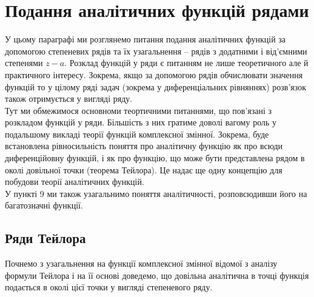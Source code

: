 
% 

% 

\setcounter{section}{4}
\section{Подання аналітичних функцій рядами}

У цьому параграфі ми розглянемо питання подання аналітичних функцій за допомогою степеневих рядів та їх узагальнення -- рядів з додатними і від'ємними степенями $z - a$. Розклад функцій у ряди є питанням не лише теоретичного але й практичного інтересу. Зокрема, якщо за допомогою рядів обчислювати значення функцій то у цілому ряді задач (зокрема у диференціальних рівняннях) розв'язок також отримується у вигляді ряду. \\

Тут ми обмежимося основноми теортичними питаннями, що пов'язані з розкладом функцій у ряди. Більшість з них гратиме доволі вагому роль у подальшому викладі теорії функцій комплексної змінної. Зокрема, буде встановлена рівносильність поняття про аналітичну функцію як про всюди диференційовну функцій, і як про функцію, що може бути представлена рядом в околі довільної точки (теорема Тейлора). Це надає ще одну концепцію для побудови теорії аналітичних функцій. \\

У пункті 9 ми також узагальнимо поняття аналітичності, розповсюдивши його на багатозначні функції.

\subsection{Ряди Тейлора}

Почнемо з узагальнення на функції комплексної змінної відомої з аналізу формули Тейлора і на її основі доведемо, що довільна аналітична в точці функція подається в околі цієї точки у вигляді степеневого ряду. \\

